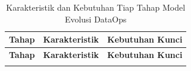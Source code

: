 {
\footnotesize
\setlength{\tabcolsep}{3pt}
\renewcommand{\arraystretch}{1.2}
\setlength{\LTpost}{0pt}
\begin{longtable}{|>{\centering\arraybackslash}m{2.5cm}|>{\raggedright\arraybackslash}m{5.95cm}|>{\raggedright\arraybackslash}m{4.8cm}|}
\caption{Karakteristik dan Kebutuhan Tiap Tahap Model Evolusi DataOps}
\label{tab:dataops_stage_legend} \\
\hline
\centering\arraybackslash\textbf{Tahap} & \centering\arraybackslash\textbf{Karakteristik} & \centering\arraybackslash\textbf{Kebutuhan Kunci} \\
\hline
\endfirsthead
\hline
\centering\arraybackslash\textbf{Tahap} & \centering\arraybackslash\textbf{Karakteristik} & \centering\arraybackslash\textbf{Kebutuhan Kunci} \\
\hline
\endhead
\endfoot
\hline
\endlastfoot


\end{longtable}}
